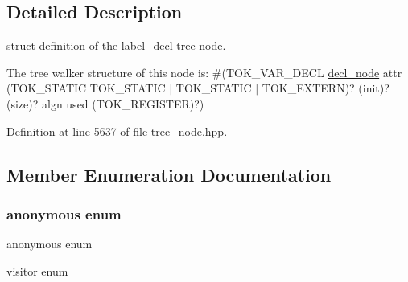 \subsection{Detailed Description}
struct definition of the label\+\_\+decl tree node. 

The tree walker structure of this node is\+: \#(T\+O\+K\+\_\+\+V\+A\+R\+\_\+\+D\+E\+CL \hyperlink{structdecl__node}{decl\+\_\+node} attr (T\+O\+K\+\_\+\+S\+T\+A\+T\+IC T\+O\+K\+\_\+\+S\+T\+A\+T\+IC $\vert$ T\+O\+K\+\_\+\+S\+T\+A\+T\+IC $\vert$ T\+O\+K\+\_\+\+E\+X\+T\+E\+RN)? (init)? (size)? algn used (T\+O\+K\+\_\+\+R\+E\+G\+I\+S\+T\+ER)?) 

Definition at line 5637 of file tree\+\_\+node.\+hpp.



\subsection{Member Enumeration Documentation}
\mbox{\label{structvar__decl_aacda5ecd2774d0af9aa1e0799c30c297}} 
\subsubsection{\texorpdfstring{anonymous enum}{anonymous enum}}
{\footnotesize\ttfamily anonymous enum}



visitor enum 

